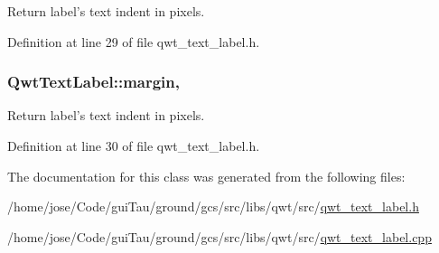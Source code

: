 Return label's text indent in pixels. 



Definition at line 29 of file qwt\-\_\-text\-\_\-label.\-h.

\hypertarget{class_qwt_text_label_ad97e23bc19c83c55422e1ec6dc49fc02}{
\subsubsection[{margin}]{ Qwt\-Text\-Label\-::margin\hspace{0.3cm}{\ttfamily [read]}, {\ttfamily [write]}}}\label{class_qwt_text_label_ad97e23bc19c83c55422e1ec6dc49fc02}


Return label's text indent in pixels. 



Definition at line 30 of file qwt\-\_\-text\-\_\-label.\-h.



The documentation for this class was generated from the following files\-:\begin{DoxyCompactItemize}
\item 
/home/jose/\-Code/gui\-Tau/ground/gcs/src/libs/qwt/src/\hyperlink{qwt__text__label_8h}{qwt\-\_\-text\-\_\-label.\-h}\item 
/home/jose/\-Code/gui\-Tau/ground/gcs/src/libs/qwt/src/\hyperlink{qwt__text__label_8cpp}{qwt\-\_\-text\-\_\-label.\-cpp}\end{DoxyCompactItemize}
